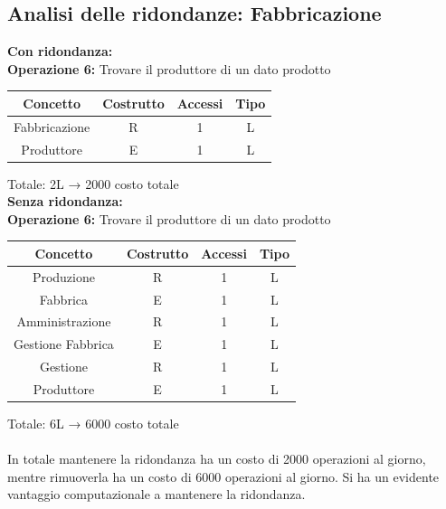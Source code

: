 \documentclass[a4paper,12pt]{report}
\begin{document}
\subsection{Analisi delle ridondanze: Fabbricazione}
\textbf{Con ridondanza:}\\
\textbf{Operazione 6:} Trovare il produttore di un dato prodotto\\
\begin{center}
    \begin{tabular}{ | c   c   c   c | } 
    \hline
	Concetto&Costrutto&Accessi&Tipo\\
	\hline
	Fabbricazione&R&1&L\\
	\hline
    Produttore&E&1&L\\
	\hline
	\end{tabular}
\end{center}
Totale: 2L → 2000 costo totale\\
\textbf{Senza ridondanza:}\\
\textbf{Operazione 6:} Trovare il produttore di un dato prodotto\\
\begin{center}
    \begin{tabular}{ | c   c   c   c | } 
    \hline
	Concetto&Costrutto&Accessi&Tipo\\
	\hline
	Produzione&R&1&L\\
	\hline
	Fabbrica&E&1&L\\
	\hline
	Amministrazione&R&1&L\\
	\hline
	Gestione Fabbrica&E&1&L\\
	\hline
	Gestione&R&1&L\\
	\hline
    Produttore&E&1&L\\
	\hline
	\end{tabular}
\end{center}
Totale: 6L → 6000 costo totale\\
\\
In totale mantenere la ridondanza ha un costo di 2000 operazioni al giorno, mentre rimuoverla ha un costo di 6000 operazioni al giorno. Si ha un evidente vantaggio computazionale a mantenere la ridondanza.\\
\end{document}
